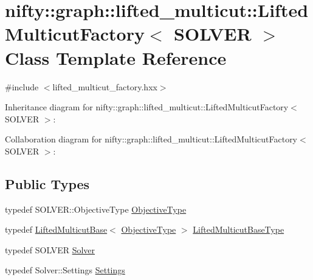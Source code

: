 \hypertarget{classnifty_1_1graph_1_1lifted__multicut_1_1LiftedMulticutFactory}{}\section{nifty\+:\+:graph\+:\+:lifted\+\_\+multicut\+:\+:Lifted\+Multicut\+Factory$<$ S\+O\+L\+V\+E\+R $>$ Class Template Reference}
\label{classnifty_1_1graph_1_1lifted__multicut_1_1LiftedMulticutFactory}


{\ttfamily \#include $<$lifted\+\_\+multicut\+\_\+factory.\+hxx$>$}



Inheritance diagram for nifty\+:\+:graph\+:\+:lifted\+\_\+multicut\+:\+:Lifted\+Multicut\+Factory$<$ S\+O\+L\+V\+E\+R $>$\+:


Collaboration diagram for nifty\+:\+:graph\+:\+:lifted\+\_\+multicut\+:\+:Lifted\+Multicut\+Factory$<$ S\+O\+L\+V\+E\+R $>$\+:
\subsection*{Public Types}
\begin{DoxyCompactItemize}
\item 
typedef S\+O\+L\+V\+E\+R\+::\+Objective\+Type \hyperlink{classnifty_1_1graph_1_1lifted__multicut_1_1LiftedMulticutFactory_aa8756716f99f691a6cff57d58bb71dd4}{Objective\+Type}
\item 
typedef \hyperlink{classnifty_1_1graph_1_1lifted__multicut_1_1LiftedMulticutBase}{Lifted\+Multicut\+Base}$<$ \hyperlink{classnifty_1_1graph_1_1lifted__multicut_1_1LiftedMulticutFactory_aa8756716f99f691a6cff57d58bb71dd4}{Objective\+Type} $>$ \hyperlink{classnifty_1_1graph_1_1lifted__multicut_1_1LiftedMulticutFactory_aa56d6140f798ec6bdf510ac80ddb7a0b}{Lifted\+Multicut\+Base\+Type}
\item 
typedef S\+O\+L\+V\+E\+R \hyperlink{classnifty_1_1graph_1_1lifted__multicut_1_1LiftedMulticutFactory_a06c07c55aa3f5d550e0f48bb4b476b3c}{Solver}
\item 
typedef Solver\+::\+Settings \hyperlink{classnifty_1_1graph_1_1lifted__multicut_1_1LiftedMulticutFactory_a48e27ca10f95291da7b3a345c255ab6f}{Settings}
\end{DoxyCompactItemize}

